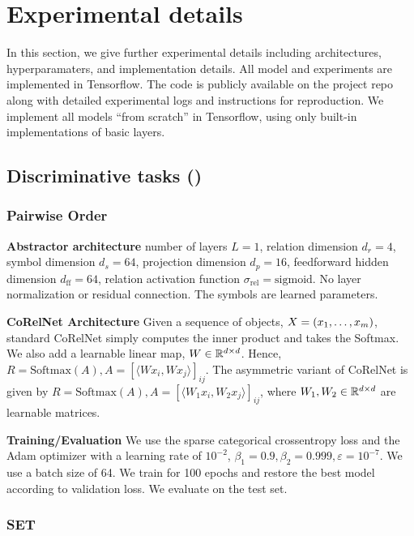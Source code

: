 \section{Experimental details}\label{sec:experimental_details}

In this section, we give further experimental details including architectures, hyperparamaters, and implementation details. All model and experiments are implemented in Tensorflow. The code is publicly available on the project repo along with detailed experimental logs and instructions for reproduction. We implement all models ``from scratch'' in Tensorflow, using only built-in implementations of basic layers.

\subsection{Discriminative tasks ()}

\subsubsection{Pairwise Order}
\textbf{Abstractor architecture} number of layers $L = 1$, relation dimension $d_r = 4$, symbol dimension $d_s = 64$, projection dimension $d_p = 16$, feedforward hidden dimension $d_{\mathrm{ff}} = 64$, relation activation function $\sigma_{\mathrm{rel}} = \mathrm{sigmoid}$. No layer normalization or residual connection. The symbols are learned parameters.

\textbf{CoRelNet Architecture} Given a sequence of objects, $X = (x_1, \ldots, x_m)$, standard CoRelNet simply computes the inner product and takes the Softmax. We also add a learnable linear map, $W \in \mathbb{R}^{d \times d}$. Hence, $R = \text{Softmax}(A), A = {\left[\langle W x_i, W x_j\rangle\right]}_{ij}$. The asymmetric variant of CoRelNet is given by $R = \text{Softmax}(A), A = {\left[\langle W_1 x_i, W_2 x_j\rangle\right]}_{ij}$, where $W_1, W_2 \in \mathbb{R}^{d \times d}$ are learnable matrices.

\textbf{Training/Evaluation} We use the sparse categorical crossentropy loss and the Adam optimizer with a learning rate of $10^{-2}$, $\beta_1 = 0.9, \beta_2 = 0.999, \varepsilon = 10^{-7}$. We use a batch size of 64. We train for 100 epochs and restore the best model according to validation loss. We evaluate on the test set.

\subsubsection{SET}

